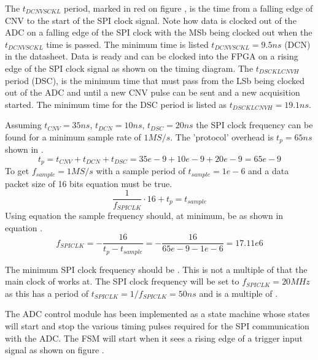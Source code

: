 The $t_{DCNVSCKL}$ period, marked in red on figure , is the time from a falling edge of CNV to the start of the SPI clock signal. Note how data is clocked out of the ADC on a falling edge of the SPI clock with the MSb being clocked out when the $t_{DCNVSCKL}$ time is passed. The minimum time is listed $t_{DCNVSCKL} = 9.5 ns$ (DCN) in the datasheet. Data is ready and can be clocked into the FPGA on a rising edge of the SPI clock signal as shown on the timing diagram. The $t_{DSCKLCNVH}$ period (DSC), is the minimum time that must pass from the LSb being clocked out of the ADC and until a new CNV pulse can be sent and a new acquisition started. The minimum time for the DSC period is listed as $t_{DSCKLCNVH} = 19.1 ns$.

Assuming $t_{CNV} = 35 ns$, $t_{DCN} = 10 ns$, $t_{DSC} = 20ns$ the SPI clock frequency can be found for a minimum sample rate of $1 MS/s$. The 'protocol' overhead is $t_p = 65 ns$ shown in .
\begin{equation}\label{eq:7_2_8_ProtocolOverhead}
        t_{p} = t_{CNV} + t_{DCN} + t_{DSC} = 35e-9 + 10 e-9 + 20 e-9 = 65 e-9
\end{equation}
To get $f_{sample} = 1 MS/s$ with a sample period of $t_{sample} = 1e-6$ and a data packet size of 16 bits equation  must be true.
\begin{equation}\label{eq:7_2_8_SampleFrq}
   \frac{1}{f_{SPICLK}} \cdot 16 + t_p = t_{sample}
\end{equation}
Using equation  the sample frequency should, at minimum, be  as shown in equation .
\begin{equation}\label{eq:7_2_8_SampleFrq2}
    f_{SPICLK} = -\frac{16}{t_{p} - t_{sample}} = -\frac{16}{65e-9 - 1e-6} = 17.11e6
 \end{equation}

The minimum SPI clock frequency should be . This is not a multiple of  that the main clock of  works at. The SPI clock frequency will be set to $f_{SPICLK} = 20 MHz$ as this has a period of $t_{SPICLK} = 1/f_{SPICLK} = 50 ns$ and is a multiple of .

 The ADC control module has been implemented as a state machine whose states will start and stop the various timing pulses required for the SPI communication with the ADC. The FSM will start when it sees a rising edge of a trigger input signal as shown on figure .

